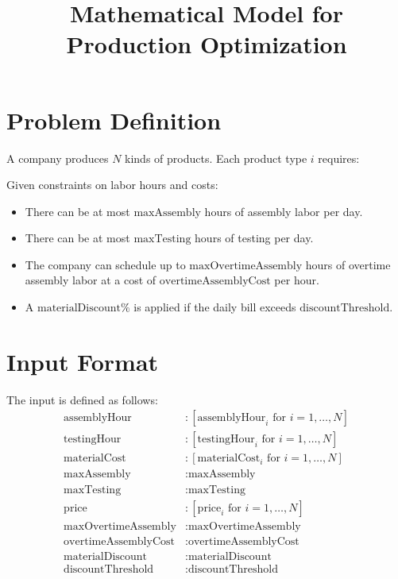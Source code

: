 \documentclass{article}
\begin{document}
\title{Mathematical Model for Production Optimization}
\author{}
\date{}
\maketitle

\section*{Problem Definition}
A company produces \( N \) kinds of products. Each product type \( i \) requires:
Given constraints on labor hours and costs:
\begin{itemize}
    \item There can be at most \( \text{maxAssembly} \) hours of assembly labor per day.
    \item There can be at most \( \text{maxTesting} \) hours of testing per day.
    \item The company can schedule up to \( \text{maxOvertimeAssembly} \) hours of overtime assembly labor at a cost of \( \text{overtimeAssemblyCost} \) per hour.
    \item A \( \text{materialDiscount}\% \) is applied if the daily bill exceeds \( \text{discountThreshold} \).
\end{itemize}

\section*{Input Format}
The input is defined as follows:
\begin{align*}
    \text{assemblyHour} & : [\text{assemblyHour}_i \text{ for } i = 1, \ldots, N] \\
    \text{testingHour} & : [\text{testingHour}_i \text{ for } i = 1, \ldots, N] \\
    \text{materialCost} & : [\text{materialCost}_i \text{ for } i = 1, \ldots, N] \\
    \text{maxAssembly} & : \text{maxAssembly} \\
    \text{maxTesting} & : \text{maxTesting} \\
    \text{price} & : [\text{price}_i \text{ for } i = 1, \ldots, N] \\
    \text{maxOvertimeAssembly} & : \text{maxOvertimeAssembly} \\
    \text{overtimeAssemblyCost} & : \text{overtimeAssemblyCost} \\
    \text{materialDiscount} & : \text{materialDiscount} \\
    \text{discountThreshold} & : \text{discountThreshold}
\end{align*}
\end{document}
